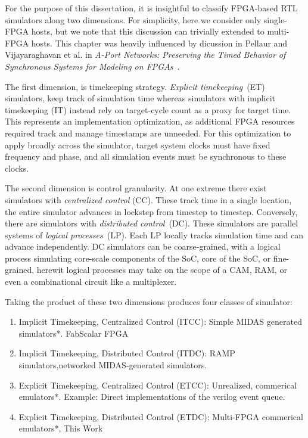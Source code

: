 

For the purpose of this dissertation, it is insightful to classify FPGA-based
RTL simulators along two dimensions. For simplicity, here we consider only
single-FPGA hosts, but we note that this discussion can trivially extended to
multi-FPGA hosts. This chapter was heavily influenced by dicussion in Pellaur
and Vijayaraghavan et al. in \emph{A-Port Networks: Preserving the Timed
Behavior of Synchronous Systems for Modeling on FPGAs}~\cite{APortNetwork}.

The first dimension, is timekeeping strategy. \emph{Explicit timekeeping}~(ET)
simulators, keep track of simulation time whereas simulators with implicit
timekeeping (IT) instead rely on target-cycle count as a proxy for target time. This represents an
implementation optimization, as additional FPGA resources required track and
manage timestamps are unneeded. For this optimization to apply broadly across
the simulator, target system clocks must have fixed frequency and phase, and
all simulation events must be synchronous to these clocks.

The second dimension is control granularity. At one extreme there exist
simulators with \emph{centralized control} (CC). These track time in
a single location, the entire simulator advances in lockstep from
timestep to timestep.  Conversely, there are simulators with \emph{distributed
control}~(DC). These simulators are parallel systems of \emph{logical
processes}~(LP). Each LP locally tracks simulation time and can advance
independently. DC simulators can be coarse-grained, with a logical process
simulating core-scale components of the SoC, core of the SoC, or fine-grained,
herewit logical processes may take on the scope of a CAM, RAM, or even a
combinational circuit like a multiplexer.

Taking the product of these two dimensions produces four classes of simulator:

\begin{enumerate}
\item{Implicit Timekeeping, Centralized Control (ITCC)}: Simple MIDAS generated simulators*. FabScalar FPGA

\item{Implicit Timekeeping, Distributed Control (ITDC)}: RAMP simulators,networked MIDAS-generated simulators.

\item{Explicit Timekeeping, Centralized Control (ETCC)}: Unrealized, commerical emulators*. Example: Direct implementations of the verilog event queue.

\item{Explicit Timekeeping, Distributed Control (ETDC)}: Multi-FPGA commerical emulators*, This Work
\end{enumerate}

